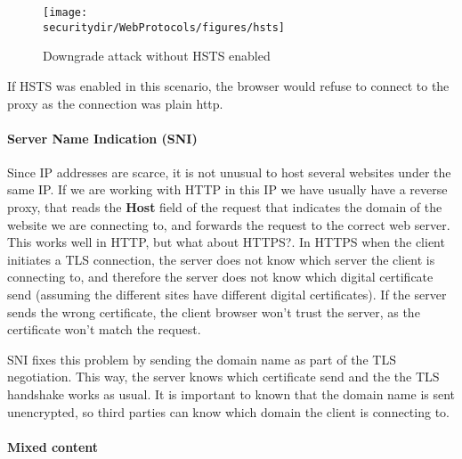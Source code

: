 \begin{figure}[htb]
	\begin{centering}
		\texttt{[image: \\securitydir/WebProtocols/figures/hsts]}
		\par
	\end{centering}
	\caption{\label{fig:hsts} Downgrade attack without HSTS enabled}
\end{figure}

If HSTS was enabled in this scenario, the browser would refuse to connect to the proxy as the connection was plain http. 


\paragraph{Server Name Indication (SNI)}
Since IP addresses are scarce, it is not unusual to host several websites under the same IP. If we are working with HTTP in this IP we have usually have a reverse proxy, that reads the \textbf{Host} field of the request that indicates the domain of the website we are connecting to, and forwards the request to the correct web server. This works well in HTTP, but what about HTTPS?. In HTTPS when the client initiates a TLS connection, the server does not know which server the client is connecting to, and therefore the server does not know which digital certificate send (assuming the different sites have different digital certificates). If the server sends the wrong certificate, the client browser won't trust the server, as the certificate won't match the request.

SNI fixes this problem by sending the domain name as part of the TLS negotiation. This way, the server knows which certificate send and the the TLS handshake works as usual. It is important to known that the domain name is sent unencrypted, so third parties can know which domain the client is connecting to.

\paragraph{Mixed content}
